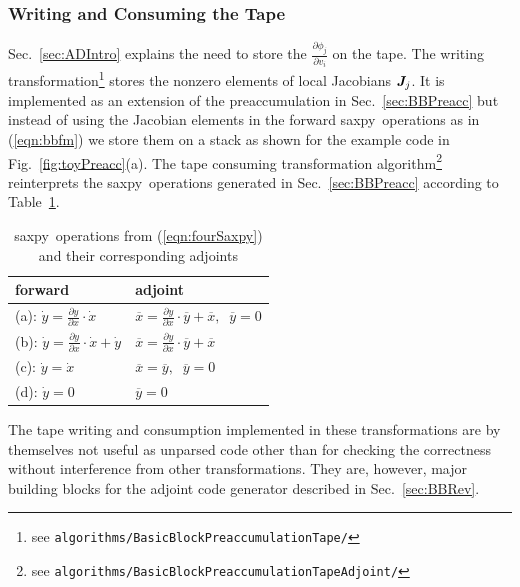 \documentclass{book}
\newcommand{\saxpy}{saxpy}
\newcommand{\bmJ}{\mbox{\bf\em J}}
\newcommand{\refsec}[1]{{Sec.~\ref{#1}}}
\newcommand{\reffig}[1]{{Fig.~\ref{#1}}}
\newcommand{\reftab}[1]{{Table~\ref{#1}}}
\newcommand{\refeqn}[1]{{(\ref{#1})}}
\begin{document}
\subsubsection{Writing and Consuming the Tape}\label{sec:bbTA}

\refsec{sec:ADIntro} explains the need to store the $\frac{\partial \phi_j}{\partial v_i}$ 
on the tape. 
The writing transformation\footnote{
  see \lstinline{algorithms/BasicBlockPreaccumulationTape/}
}
stores the nonzero elements of local
Jacobians $\bmJ_j$. It is implemented as an extension of the 
preaccumulation in \refsec{sec:BBPreacc} but instead of using the Jacobian elements 
in the forward 
\saxpy\ operations as in \refeqn{eqn:bbfm} we store them 
on a stack as shown for the example code in \reffig{fig:toyPreacc}(a). 
The tape consuming transformation algorithm\footnote{ 
  see \lstinline{algorithms/BasicBlockPreaccumulationTapeAdjoint/}
} 
reinterprets
the \saxpy\ operations generated in \refsec{sec:BBPreacc} 
according to \reftab{tab:saxpyAdj}.
\begin{table}
  \begin{center}
    \begin{tabular}{l|l}
      forward & adjoint\\\hline
      (a): $\dot{y} = \frac{\partial y }{\partial x }\cdot \dot{x}$           & $\overline{x} = \frac{\partial y }{\partial x }\cdot \overline{y} + \overline{x},\;\;\overline{y}=0$ \\
      (b): $\dot{y} = \frac{\partial y }{\partial x }\cdot \dot{x} + \dot{y}$ & $\overline{x} = \frac{\partial y }{\partial x }\cdot \overline{y} + \overline{x}$ \\
      (c): $\dot{y} = \dot{x}$ 					            & $\overline{x} = \overline{y},\;\;\overline{y}=0$\\
      (d): $\dot{y} = 0$ 						            & $\overline{y} = 0$ 
    \end{tabular}
  \end{center}
  \caption{\saxpy\ operations  from \refeqn{eqn:fourSaxpy} and their corresponding adjoints} \label{tab:saxpyAdj}
\end{table} 
The tape writing and consumption implemented in these transformations are 
by themselves not useful as unparsed code other than for checking the correctness without 
interference from other transformations. 
They are, however, major building blocks for the  
adjoint code generator described in \refsec{sec:BBRev}.
\end{document}
